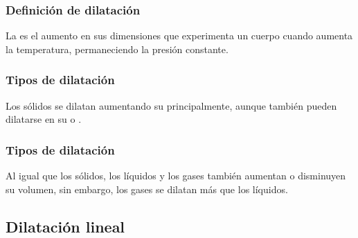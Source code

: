 \documentclass[14pt]{beamer}
\begin{document}
\begin{frame}
\frametitle{Definición de dilatación}
La  es el aumento en sus dimensiones que experimenta un cuerpo cuando aumenta la temperatura, permaneciendo la presión constante.
\end{frame}
\begin{frame}
\frametitle{Tipos de dilatación}
Los sólidos se dilatan aumentando su  principalmente, \pause aunque también pueden dilatarse en su  \pause o .
\end{frame}
\begin{frame}
\frametitle{Tipos de dilatación}
Al igual que los sólidos, los líquidos y los gases también aumentan o disminuyen su volumen, sin embargo, los gases se dilatan más que los líquidos.
\end{frame}

\subsection{Dilatación lineal}
\end{document}
